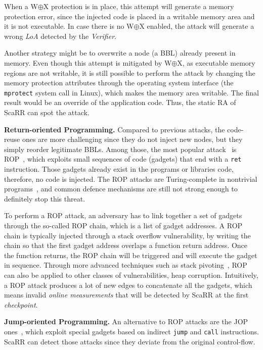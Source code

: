 When a W$\oplus$X protection is in place, this attempt will generate a memory 
protection error, since the injected code is placed in a writable memory area 
and it is not executable. In case there is no W$\oplus$X enabled, the attack 
will generate a wrong \emph{LoA} detected by the \emph{Verifier}.

Another strategy might be to overwrite a node (\ie a BBL) already present in 
memory. 
Even though this attempt is mitigated by W$\oplus$X, as executable memory 
regions are not writable, it is still possible to perform the attack by 
changing the memory protection attributes through the operating system 
interface (\eg the \texttt{mprotect} system call in Linux), which makes the 
memory area writable. 
The final result would be an override of the application code. Thus, the static 
RA of ScaRR can spot the attack.

\textbf{Return-oriented Programming.}
Compared to previous attacks, the code-reuse ones are more challenging since 
they do not inject new nodes, but they simply reorder legitimate BBLs. Among 
those, the most popular attack~\citep{shacham2007geometry} is 
ROP~\citep{carlini2014rop}, which
exploits small sequences of code (gadgets) that end with a \texttt{ret} 
instruction. Those gadgets already exist in the programs or libraries code, 
therefore, no code is injected. The ROP attacks are Turing-complete in 
nontrivial programs~\citep{carlini2014rop}, and common defence mechanisms are 
still not strong enough to definitely stop this threat.

To perform a ROP attack, an adversary has to link together a set of gadgets 
through the so-called ROP chain, which is a list of gadget addresses. A ROP 
chain is typically injected through a stack overflow vulnerability, by writing 
the chain so that the first gadget address overlaps a function return address. 
Once the function returns, the ROP chain will be triggered and will execute the 
gadget in sequence. Through more advanced techniques such as stack 
pivoting~\citep{PracticalROP}, ROP can also be applied to other classes of 
vulnerabilities, \eg heap corruption.
Intuitively, a ROP attack produces a lot of new edges to concatenate all the 
gadgets, which means invalid \emph{online measurements} that will be detected 
by ScaRR at the first \emph{checkpoint}. 

\textbf{Jump-oriented Programming.}
An alternative to ROP attacks are the JOP 
ones~\citep{yao2013jop,bletsch2011jump}, which exploit special gadgets based on 
indirect \texttt{jump} and \texttt{call} instructions.
ScaRR can detect those attacks since they deviate from the original 
control-flow.

